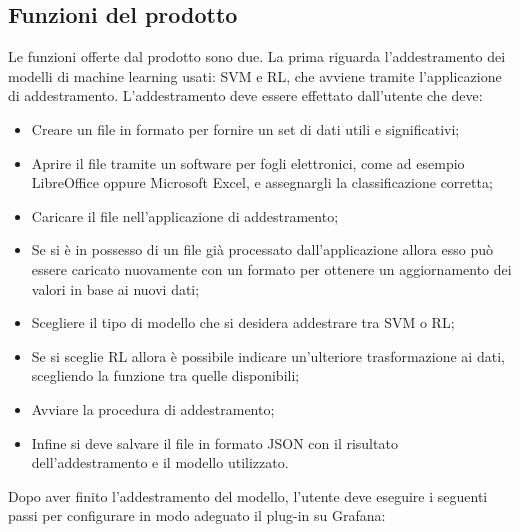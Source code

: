 \documentclass[../analisi-dei-requisiti.tex]{subfiles}
\begin{document}
\subsection{Funzioni del prodotto}
\label{subs:funzioni_del_prodotto}
	Le funzioni offerte dal prodotto sono due.
	La prima riguarda l'addestramento dei modelli di machine learning usati: SVM e RL, che avviene tramite l'applicazione di addestramento. L'addestramento deve essere effettato dall'utente che deve:
	\begin{itemize}
		\item{Creare un file in formato  per fornire un set di dati utili e significativi;}
		\item{Aprire il file tramite un software per fogli elettronici, come ad esempio LibreOffice oppure Microsoft Excel, e assegnargli la classificazione corretta;}
		\item{Caricare il file nell'applicazione di addestramento;}
		\item{Se si è in possesso di un file già processato dall'applicazione allora esso può essere caricato nuovamente con un formato  per ottenere un aggiornamento dei valori in base ai nuovi dati;}
		\item{Scegliere il tipo di modello che si desidera addestrare tra SVM o RL;}
		\item{Se si sceglie RL allora è possibile indicare un'ulteriore trasformazione ai dati, scegliendo la funzione tra quelle disponibili;}
		\item{Avviare la procedura di addestramento;}
		\item{Infine si deve salvare il file in formato JSON con il risultato dell'addestramento e il modello utilizzato.}
	\end{itemize}
	Dopo aver finito l'addestramento del modello, l'utente deve eseguire i seguenti passi per configurare in modo adeguato il plug-in su Grafana:
\end{document}
